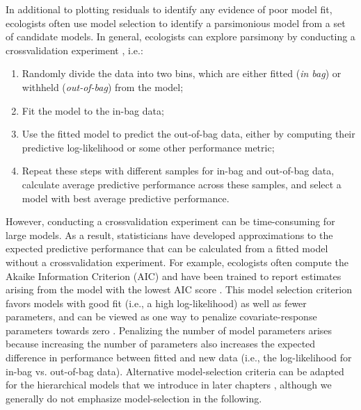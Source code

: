 In additional to plotting residuals to identify any evidence of poor model fit, ecologists often use model selection to identify a parsimonious model from a set of candidate models. In general, ecologists can explore parsimony by conducting a crossvalidation experiment \cite{roberts_cross-validation_2017}, i.e.:
\begin{enumerate}
    \item Randomly divide the data into two bins, which are either fitted (\textit{in bag}) or withheld (\textit{out-of-bag}) from the model;

    \item Fit the model to the in-bag data;

    \item Use the fitted model to predict the out-of-bag data, either by computing their predictive log-likelihood or some other performance metric;

    \item Repeat these steps with different samples for in-bag and out-of-bag data, calculate average predictive performance across these samples, and select a model with best average predictive performance.
\end{enumerate}
However, conducting a crossvalidation experiment can be time-consuming for large models.  As a result, statisticians have developed approximations to the expected predictive performance that can be calculated from a fitted model without a crossvalidation experiment.  For example, ecologists often compute the Akaike Information Criterion (AIC) \cite{akaike_new_1974} and have been trained to report estimates arising from the model with the lowest AIC score \cite{burnham_model_2002}.  This model selection criterion favors models with good fit (i.e., a high log-likelihood) as well as fewer parameters, and can be viewed as one way to penalize covariate-response parameters towards zero \cite{hooten_guide_2015}.  Penalizing the number of model parameters arises because increasing the number of parameters also increases the expected difference in performance between fitted and new data (i.e., the log-likelihood for in-bag vs. out-of-bag data).  Alternative model-selection criteria can be adapted for the hierarchical models that we introduce in later chapters \cite{wood_smoothing_2016,vaida_conditional_2005}, although we generally do not emphasize model-selection in the following.  

